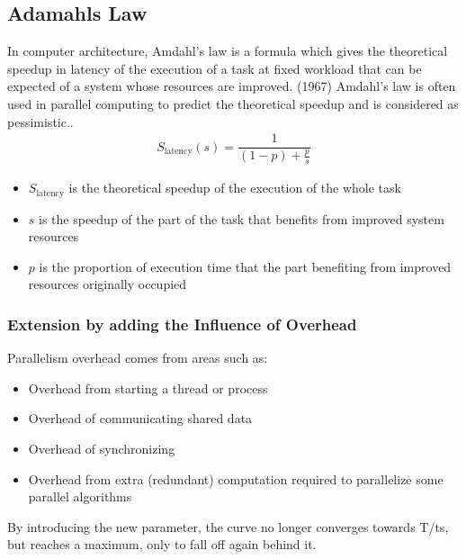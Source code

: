 \subsection{Adamahls Law}
In computer architecture, Amdahl's law is a formula which gives the theoretical speedup in latency of the execution of a task at fixed workload that can be expected of a system whose resources are improved. (1967)
Amdahl's law is often used in parallel computing to predict the theoretical speedup and is considered as pessimistic..
\begin{align*}
    S_\text{latency}(s) = \dfrac{1}{(1-p) + \frac{p}{s}}
\end{align*}
\begin{itemize}
    \item $S_\text{latency}$ is the theoretical speedup of the execution of the whole task
    \item $s$ is the speedup of the part of the task that benefits from improved system resources
    \item $p$ is the proportion of execution time that the part benefiting from improved resources originally occupied
\end{itemize}
\subsubsection{Extension by adding the Influence of Overhead}
Parallelism overhead comes from areas such as:
\begin{itemize}
    \item Overhead from starting a thread or process
    \item Overhead of communicating shared data
    \item Overhead of synchronizing
    \item Overhead from extra (redundant) computation required to parallelize some parallel algorithms
\end{itemize}
By introducing the new parameter, the curve no longer converges towards T/ts, but reaches a maximum, only to fall off again behind it.

